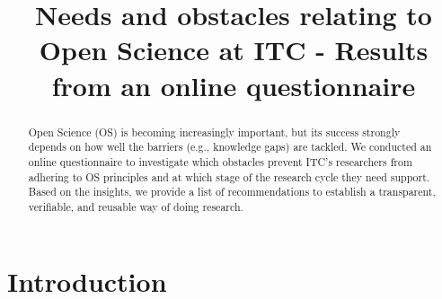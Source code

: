 \documentclass[gc, manuscript]{copernicus}
\begin{document}
\title{Needs and obstacles relating to Open Science at ITC - Results
from an online questionnaire}











\received{}
\pubdiscuss{} %
\revised{}
\accepted{}
\published{}




\maketitle


\begin{abstract}
Open Science (OS) is becoming increasingly important, but its success
strongly depends on how well the barriers (e.g., knowledge gaps) are
tackled. We conducted an online questionnaire to investigate which
obstacles prevent ITC's researchers from adhering to OS principles and
at which stage of the research cycle they need support. Based on the
insights, we provide a list of recommendations to establish a
transparent, verifiable, and reusable way of doing research.
\end{abstract}




\section{Introduction}
\end{document}
